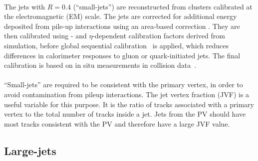 \paragraph{}
The jets with $R=0.4$ (``small-\R jets'') are reconstructed from clusters calibrated at the electromagnetic (EM) scale. The jets are corrected for additional energy deposited from pile-up interactions using an area-based correction \cite{Cacciari:2008gn}. 
They are then calibrated using \pt- and $\eta$-dependent calibration factors derived from simulation, before global sequential calibration~\cite{Aad:2011he} is applied, which reduces differences in calorimeter responses to gluon or quark-initiated jets. 
The final calibration is based on in situ measurements in collision data~\cite{ATL-PHYS-PUB-2015-015}.

\paragraph{}
``Small-\R jets'' are required to be consistent with the primary vertex, in order to avoid contamination from pileup interactions. 
The jet vertex fraction (JVF) is a useful variable for this purpose. 
It is the ratio of tracks associated with a primary vertex to the total number of tracks inside a jet. 
Jets from the PV should have most tracks consistent with the PV and therefore have a large JVF value.

\subsection{Large-\R jets}

